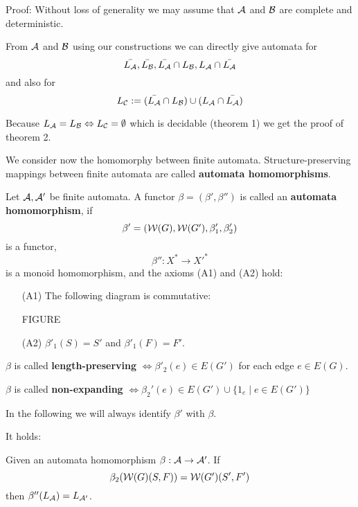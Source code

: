Proof: Without loss of generality we may assume that $\mbox{$\mathcal{A}$}$ and $\mbox{$\mathcal{B}$}$ are
complete and deterministic. 

From $\mbox{$\mathcal{A}$}$ and $\mbox{$\mathcal{B}$}$ using our constructions we can directly give automata
for 
\[\bar{\mbox{$L_{\mathcal{A}}$}}, \bar{\mbox{$L_{\mathcal{B}}$}}, \bar{\mbox{$L_{\mathcal{A}}$}} \cap
\mbox{$L_{\mathcal{B}}$}, \mbox{$L_{\mathcal{A}}$} \cap \bar{\mbox{$L_{\mathcal{A}}$}}\]
and also for 
\[ \mbox{$L_{\mathcal{C}}$} := (\bar{\mbox{$L_{\mathcal{A}}$}} \cap \mbox{$L_{\mathcal{B}}$}) \cup (\mbox{$L_{\mathcal{A}}$} \cap
\bar{\mbox{$L_{\mathcal{A}}$}}) \]

Because $\mbox{$L_{\mathcal{A}}$} = \mbox{$L_{\mathcal{B}}$} \Leftrightarrow \mbox{$L_{\mathcal{C}}$} = \emptyset$ which
is decidable (theorem 1) we get the proof of theorem 2.

We consider now the homomorphy between finite automata. Structure-preserving
mappings between finite automata are called {\bf automata homomorphisms}.

\begin{definition}
Let $\mbox{$\mathcal{A}$}, \mbox{$\mathcal{A'}$}$ be finite automata. A functor $\beta = (\beta', \beta'')$
is called an {\bf automata homomorphism}, if
\[ \beta' = (\mbox{$\mathcal{W}(G)$}, \mbox{$\mathcal{W}(G')$}, \beta'_1, \beta'_2) \]
is a functor,
\[ \beta'': X^* \to X'^*	\]
is a monoid homomorphism, and the axioms (A1) and (A2) hold:
\begin{itemize}
  \item[(A1)] The following diagram is commutative:
  
  FIGURE
  
  \item[(A2)] $\beta'_1(S) = S'$ and $\beta'_1(F) = F'$. 
\end{itemize}

$\beta$ is called {\bf length-preserving} $\Leftrightarrow \beta'_2(e) \in
E(G')$ for each edge $e \in E(G)$.

$\beta$ is called {\bf non-expanding} $\Leftrightarrow \beta_2'(e) \in E(G')
\cup \{ 1_e \mid e \in E(G') \}$
\end{definition}

In the following we will always identify $\beta'$ with $\beta$.

It holds:

\begin{theorem}
Given an automata homomorphism $\beta: \mbox{$\mathcal{A}$} \to \mbox{$\mathcal{A'}$}$. If
\[\beta_2(\mbox{$\mathcal{W}(G)$}(S,F)) = \mbox{$\mathcal{W}(G')$}(S',F')\]
then $\beta''(\mbox{$L_{\mathcal{A}}$}) = \mbox{$L_{\mathcal{A'}}$}$.
\end{theorem}






























